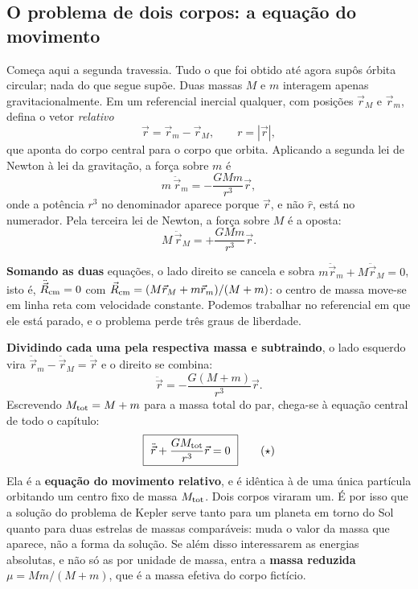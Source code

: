 \documentclass[11pt,a4paper]{article}
\begin{document}
\subsection*{O problema de dois corpos: a equação do movimento}

Começa aqui a segunda travessia. Tudo o que foi obtido até agora supôs órbita circular; nada do que segue
supõe. Duas massas $M$ e $m$ interagem apenas gravitacionalmente. Em um referencial inercial qualquer, com
posições $\vec{r}_M$ e $\vec{r}_m$, defina o vetor \emph{relativo}
\[
\vec{r}=\vec{r}_m-\vec{r}_M,
\qquad
r=|\vec{r}|,
\]
que aponta do corpo central para o corpo que orbita. Aplicando a segunda lei de Newton à lei da gravitação, a
força sobre $m$ é
\[
m\,\ddot{\vec{r}}_m=-\frac{GMm}{r^{3}}\vec{r},
\]
onde a potência $r^{3}$ no denominador aparece porque $\vec{r}$, e não $\hat{r}$, está no numerador. Pela
terceira lei de Newton, a força sobre $M$ é a oposta:
\[
M\,\ddot{\vec{r}}_M=+\frac{GMm}{r^{3}}\vec{r}.
\]

\textbf{Somando as duas} equações, o lado direito se cancela e sobra
$m\ddot{\vec{r}}_m+M\ddot{\vec{r}}_M=0$, isto é, $\ddot{\vec{R}}_{\rm cm}=0$ com
$\vec{R}_{\rm cm}=(M\vec{r}_M+m\vec{r}_m)/(M+m)$: o centro de massa move-se em linha reta com velocidade
constante. Podemos trabalhar no referencial em que ele está parado, e o problema perde três graus de liberdade.

\textbf{Dividindo cada uma pela respectiva massa e subtraindo}, o lado esquerdo vira
$\ddot{\vec{r}}_m-\ddot{\vec{r}}_M=\ddot{\vec{r}}$ e o direito se combina:
\[
\ddot{\vec{r}}=-\frac{G(M+m)}{r^{3}}\vec{r}.
\]
Escrevendo $M_{\rm tot}=M+m$ para a massa total do par, chega-se à equação central de todo o capítulo:
\begin{equation}
\boxed{\ \ddot{\vec{r}}+\frac{GM_{\rm tot}}{r^{3}}\vec{r}=0\ }
\tag{$\star$}
\end{equation}
Ela é a \textbf{equação do movimento relativo}, e é idêntica à de uma única partícula orbitando um centro fixo
de massa $M_{\rm tot}$. Dois corpos viraram um. É por isso que a solução do problema de Kepler serve tanto
para um planeta em torno do Sol quanto para duas estrelas de massas comparáveis: muda o valor da massa que
aparece, não a forma da solução. Se além disso interessarem as energias absolutas, e não só as por unidade de
massa, entra a \textbf{massa reduzida} $\mu=Mm/(M+m)$, que é a massa efetiva do corpo fictício.
\end{document}
